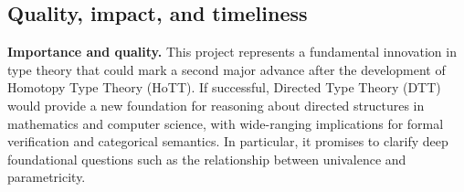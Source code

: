 \documentclass[a4paper,11pt]{article}
\renewcommand{\paragraph}[1]{\textbf{#1.}}
\begin{document}







\subsection{Quality, impact, and timeliness}

\paragraph{Importance and quality}
This project represents a fundamental innovation in type theory that
could mark a second major advance after the development of Homotopy
Type Theory (HoTT). If successful, Directed Type Theory (DTT) would
provide a new foundation for reasoning about directed structures in
mathematics and computer science, with wide-ranging implications for
formal verification and categorical semantics. In particular, it
promises to clarify deep foundational questions such as the
relationship between univalence and parametricity.
\end{document}
